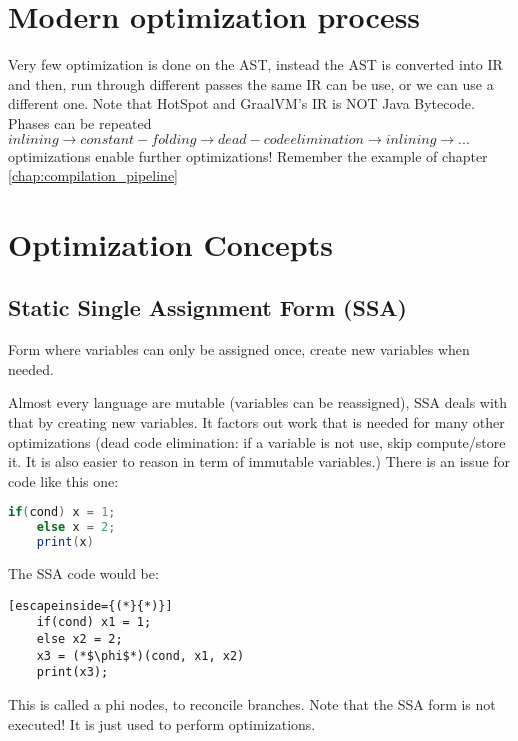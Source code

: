 \section{Modern optimization process}
Very few optimization is done on the AST, instead the AST is converted into IR
and then, run through different passes the same IR can be use, or we can use a
different one. Note that HotSpot and GraalVM's IR is NOT Java Bytecode. Phases
can be repeated $inlining \rightarrow constant-folding \rightarrow dead-code
elimination \rightarrow inlining \rightarrow ...$ optimizations enable further
optimizations! Remember the example of chapter \ref{chap:compilation_pipeline}

\section{Optimization Concepts}
\subsection{Static Single Assignment Form (SSA)}
\theoremstyle{definition}
\begin{definition}[SSA]
    Form where variables can only be assigned once, create new variables when needed.
\end{definition}
Almost every language are mutable (variables can be reassigned), SSA deals with
that by creating new variables. It factors out work that is needed for many
other optimizations (dead code elimination: if a variable is not use, skip
compute/store it. It is also easier to reason in term of immutable variables.)
There is an issue for code like this one:
\begin{lstlisting}[language=Java]
    if(cond) x = 1;
    else x = 2;
    print(x)
\end{lstlisting}
The SSA code would be:
\begin{lstlisting}[escapeinside={(*}{*)}]
    if(cond) x1 = 1;
    else x2 = 2;
    x3 = (*$\phi$*)(cond, x1, x2)
    print(x3);
\end{lstlisting}
This is called a phi nodes, to reconcile branches. Note that the SSA form is not
executed! It is just used to perform optimizations.

